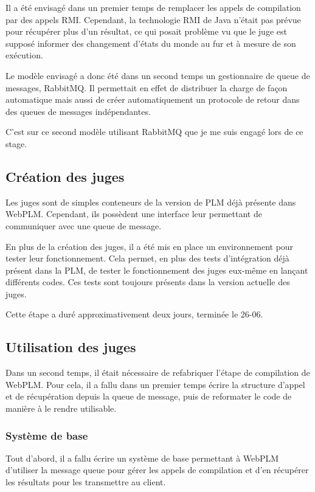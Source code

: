\documentclass[stage]{tnreport}
\begin{document}
Il a été envisagé dans un premier temps de remplacer les appels de compilation par des appels RMI.
Cependant, la technologie RMI de Java n'était pas prévue pour récupérer plus d'un résultat, ce qui posait problème vu que le juge est supposé informer des changement d'états du monde au fur et à mesure de son exécution.

Le modèle envisagé a donc été dans un second temps un gestionnaire de queue de messages, RabbitMQ. Il permettait en effet de distribuer la charge de façon automatique mais aussi de créer automatiquement un protocole de retour dans des queues de messages indépendantes.

C'est sur ce second modèle utilisant RabbitMQ que je me suis engagé lors de ce stage.

\subsection{Création des juges}

Les juges sont de simples conteneurs de la version de PLM déjà présente dans WebPLM. Cependant, ils possèdent une interface leur permettant de communiquer avec une queue de message.

En plus de la création des juges, il a été mis en place un environnement pour tester leur fonctionnement. Cela permet, en plus des tests d'intégration déjà présent dans la PLM, de tester le fonctionnement des juges eux-même en lançant différents codes. Ces tests sont toujours présents dans la version actuelle des juges.

Cette étape a duré approximativement deux jours, terminée le 26-06.

\subsection{Utilisation des juges}

Dans un second temps, il était nécessaire de refabriquer l'étape de compilation de WebPLM. Pour cela, il a fallu dans un premier temps écrire la structure d'appel et de récupération depuis la queue de message, puis de reformater le code de manière à le rendre utilisable.

\subsubsection{Système de base}
Tout d'abord, il a fallu écrire un système de base permettant à WebPLM d'utiliser la message queue pour gérer les appels de compilation et d'en récupérer les résultats pour les transmettre au client.
\end{document}
